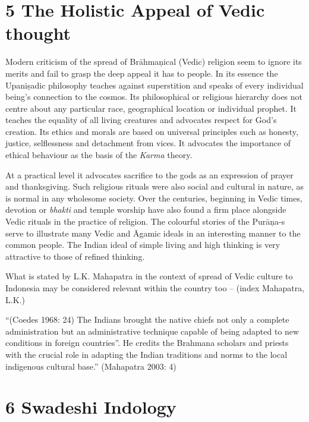 \section*{5 The Holistic Appeal of Vedic thought}

Modern criticism of the spread of Brāhmaņical (Vedic) religion seem to ignore its merits and fail to grasp the deep appeal it has to people. In its essence the Upaniṣadic philosophy teaches against superstition and speaks of every individual being’s connection to the cosmos. Its philosophical or religious hierarchy does not centre about any particular race, geographical location or individual prophet. It teaches the equality of all living creatures and advocates respect for God’s creation. Its ethics and morals are based on universal principles such as honesty, justice, selflessness and detachment from vices. It advocates the importance of ethical behaviour as the basis of the \textit{Karma} theory.

At a practical level it advocates sacrifice to the gods as an expression of prayer and thanksgiving. Such religious rituals were also social and cultural in nature, as is normal in any wholesome society. Over the centuries, beginning in Vedic times, devotion or \textit{bhakti} and temple worship have also found a firm place alongside Vedic rituals in the practice of religion. The colourful stories of the Purāņa-s serve to illustrate many Vedic and Āgamic ideals in an interesting manner to the common people. The Indian ideal of simple living and high thinking is very attractive to those of refined thinking. 

What is stated by L.K. Mahapatra in the context of spread of Vedic culture to Indonesia may be considered relevant within the country too – (index Mahapatra, L.K.)

\begin{myquote}
“(Coedes 1968: 24) The Indians brought the native chiefs not only a complete administration but an administrative technique capable of being adapted to new conditions in foreign countries”. He credits the Brahmana scholars and priests with the crucial role in adapting the Indian traditions and norms to the local indigenous cultural base.” (Mahapatra 2003: 4)
\end{myquote}


\section*{6 Swadeshi Indology}

